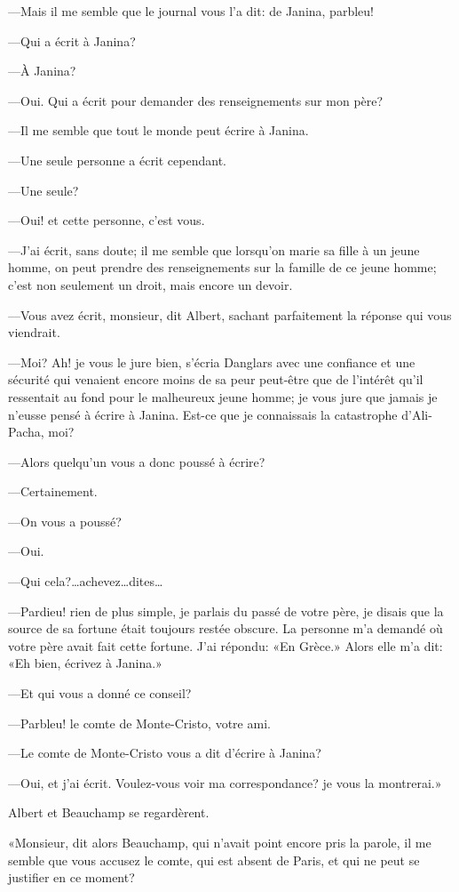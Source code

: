 —Mais il me semble que le journal vous l'a dit: de Janina, parbleu! 

—Qui a écrit à Janina? 

—À Janina? 

—Oui. Qui a écrit pour demander des renseignements sur mon père? 

—Il me semble que tout le monde peut écrire à Janina. 

—Une seule personne a écrit cependant. 

—Une seule? 

—Oui! et cette personne, c'est vous. 

—J'ai écrit, sans doute; il me semble que lorsqu'on marie sa fille à un jeune homme, on peut prendre des renseignements sur la famille de ce jeune homme; c'est non seulement un droit, mais encore un devoir. 

—Vous avez écrit, monsieur, dit Albert, sachant parfaitement la réponse qui vous viendrait. 

—Moi? Ah! je vous le jure bien, s'écria Danglars avec une confiance et une sécurité qui venaient encore moins de sa peur peut-être que de l'intérêt qu'il ressentait au fond pour le malheureux jeune homme; je vous jure que jamais je n'eusse pensé à écrire à Janina. Est-ce que je connaissais la catastrophe d'Ali-Pacha, moi? 

—Alors quelqu'un vous a donc poussé à écrire? 

—Certainement. 

—On vous a poussé? 

—Oui. 

—Qui cela?\dots achevez\dots dites\dots 

—Pardieu! rien de plus simple, je parlais du passé de votre père, je disais que la source de sa fortune était toujours restée obscure. La personne m'a demandé où votre père avait fait cette fortune. J'ai répondu: «En Grèce.» Alors elle m'a dit: «Eh bien, écrivez à Janina.» 

—Et qui vous a donné ce conseil? 

—Parbleu! le comte de Monte-Cristo, votre ami. 

—Le comte de Monte-Cristo vous a dit d'écrire à Janina? 

—Oui, et j'ai écrit. Voulez-vous voir ma correspondance? je vous la montrerai.» 

Albert et Beauchamp se regardèrent. 

«Monsieur, dit alors Beauchamp, qui n'avait point encore pris la parole, il me semble que vous accusez le comte, qui est absent de Paris, et qui ne peut se justifier en ce moment? 

